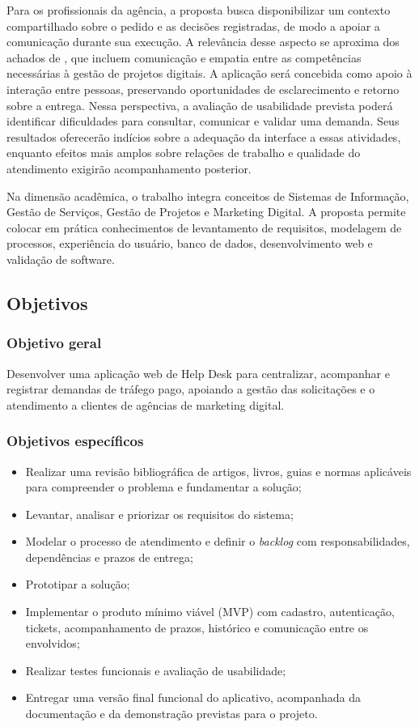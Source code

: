 Para os profissionais da agência, a proposta busca disponibilizar um contexto compartilhado sobre o pedido e as decisões registradas, de modo a apoiar a comunicação durante sua execução. A relevância desse aspecto se aproxima dos achados de , que incluem comunicação e empatia entre as competências necessárias à gestão de projetos digitais. A aplicação será concebida como apoio à interação entre pessoas, preservando oportunidades de esclarecimento e retorno sobre a entrega. Nessa perspectiva, a avaliação de usabilidade prevista poderá identificar dificuldades para consultar, comunicar e validar uma demanda. Seus resultados oferecerão indícios sobre a adequação da interface a essas atividades, enquanto efeitos mais amplos sobre relações de trabalho e qualidade do atendimento exigirão acompanhamento posterior.

Na dimensão acadêmica, o trabalho integra conceitos de Sistemas de Informação, Gestão de Serviços, Gestão de Projetos e Marketing Digital. A proposta permite colocar em prática conhecimentos de levantamento de requisitos, modelagem de processos, experiência do usuário, banco de dados, desenvolvimento web e validação de software.

\subsection{\esp Objetivos}

\subsubsection{\esp Objetivo geral}

Desenvolver uma aplicação web de Help Desk para centralizar, acompanhar e registrar demandas de tráfego pago, apoiando a gestão das solicitações e o atendimento a clientes de agências de marketing digital.

\subsubsection{\esp Objetivos específicos}

\begin{itemize}
\item Realizar uma revisão bibliográfica de artigos, livros, guias e normas aplicáveis para compreender o problema e fundamentar a solução;
\item Levantar, analisar e priorizar os requisitos do sistema;
\item Modelar o processo de atendimento e definir o \textit{backlog} com responsabilidades, dependências e prazos de entrega;
\item Prototipar a solução;
\item Implementar o produto mínimo viável (MVP) com cadastro, autenticação, tickets, acompanhamento de prazos, histórico e comunicação entre os envolvidos;
\item Realizar testes funcionais e avaliação de usabilidade;
\item Entregar uma versão final funcional do aplicativo, acompanhada da documentação e da demonstração previstas para o projeto.
\end{itemize}

